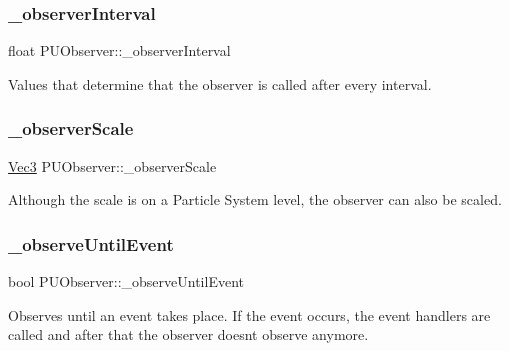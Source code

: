 \subsubsection{\texorpdfstring{\+\_\+observer\+Interval}{\_observerInterval}}
{\footnotesize\ttfamily float P\+U\+Observer\+::\+\_\+observer\+Interval\hspace{0.3cm}{\ttfamily [protected]}}

Values that determine that the observer is called after every interval. \mbox{\label{classPUObserver_ad96714e5e2acc265fffcdfcaf8cdac58}} 
\subsubsection{\texorpdfstring{\+\_\+observer\+Scale}{\_observerScale}}
{\footnotesize\ttfamily \hyperlink{classVec3}{Vec3} P\+U\+Observer\+::\+\_\+observer\+Scale\hspace{0.3cm}{\ttfamily [protected]}}

Although the scale is on a Particle System level, the observer can also be scaled. \mbox{\label{classPUObserver_ac52443fc22487cd03368972848813e52}} 
\subsubsection{\texorpdfstring{\+\_\+observe\+Until\+Event}{\_observeUntilEvent}}
{\footnotesize\ttfamily bool P\+U\+Observer\+::\+\_\+observe\+Until\+Event\hspace{0.3cm}{\ttfamily [protected]}}

Observes until an event takes place. If the event occurs, the event handlers are called and after that the observer doesn\textquotesingle{}t observe anymore. \mbox{\label{classPUObserver_ac350905c69ad227b05ae5c981d6e725a}} 
